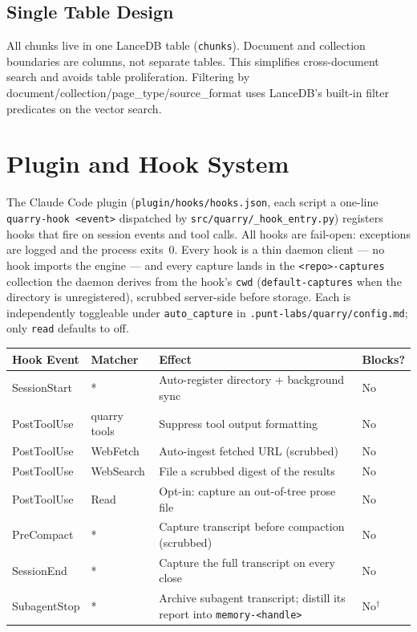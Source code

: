 \documentclass[a4paper,10pt]{article}
\newcommand{\modpath}[1]{\texttt{src/quarry/#1}}
\begin{document}
\subsection{Single Table Design}

All chunks live in one LanceDB table (\texttt{chunks}).  Document and
collection boundaries are columns, not separate tables.  This
simplifies cross-document search and avoids table proliferation.
Filtering by document/collection/page\_type/source\_format uses
LanceDB's built-in filter predicates on the vector search.

\section{Plugin and Hook System}

The Claude Code plugin (\texttt{plugin/hooks/hooks.json}, each script a
one-line \texttt{quarry-hook <event>} dispatched by
\modpath{\_hook\_entry.py}) registers hooks that fire on session events
and tool calls.  All hooks are fail-open: exceptions are logged and the
process exits~0.  Every hook is a thin daemon client --- no hook imports
the engine --- and every capture lands in the \texttt{<repo>-captures}
collection the daemon derives from the hook's \texttt{cwd}
(\texttt{default-captures} when the directory is unregistered), scrubbed
server-side before storage.  Each is independently toggleable under
\texttt{auto\_capture} in \texttt{.punt-labs/quarry/config.md}; only
\texttt{read} defaults to off.

\begin{center}
\begin{tabular}{llp{5cm}l}
\toprule
\textbf{Hook Event} & \textbf{Matcher} & \textbf{Effect} &
  \textbf{Blocks?} \\
\midrule
SessionStart  & * & Auto-register directory + background sync &
  No \\
PostToolUse   & quarry tools & Suppress tool output formatting &
  No \\
PostToolUse   & WebFetch & Auto-ingest fetched URL (scrubbed) &
  No \\
PostToolUse   & WebSearch & File a scrubbed digest of the results &
  No \\
PostToolUse   & Read & Opt-in: capture an out-of-tree prose file &
  No \\
PreCompact    & * & Capture transcript before compaction (scrubbed) &
  No \\
SessionEnd    & * & Capture the full transcript on every close &
  No \\
SubagentStop  & * & Archive subagent transcript; distill its report
  into \texttt{memory-<handle>} & No$^{\dagger}$ \\
\bottomrule
\end{tabular}
\end{center}
\end{document}
